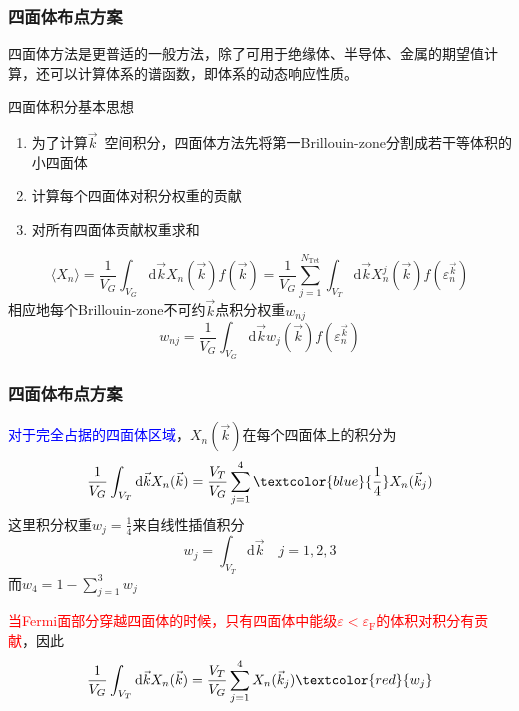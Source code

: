 \frame
{
	\frametitle{四面体布点方案}
	四面体方法是更普适的一般方法，除了可用于绝缘体、半导体、金属的期望值计算，还可以计算体系的谱函数，即体系的动态响应性质。

	四面体积分基本思想
	\begin{enumerate}
		\item 为了计算$\vec k$~空间积分，四面体方法先将第一\textrm{Brillouin-zone}分割成若干等体积的小四面体
		\item 计算每个四面体对积分权重的贡献
		\item 对所有四面体贡献权重求和
	\end{enumerate}
	\begin{displaymath}
		\langle X_n\rangle=\dfrac1{V_G}\int_{V_G}\mathrm{d}\vec kX_n(\vec k)f(\vec k)=\dfrac1{V_G}\sum_{j=1}^{N_{\mathrm{Tet}}}\int_{V_T}\mathrm{d}\vec kX_n^j(\vec k)f(\varepsilon_n^{\vec k})
	\end{displaymath}
	相应地每个\textrm{Brillouin-zone}不可约$\vec k$点积分权重$w_{nj}$
	\begin{displaymath}
		w_{nj}=\dfrac1{V_G}\int_{V_G}\mathrm{d}\vec kw_j(\vec k)f(\varepsilon_n^{\vec k})
	\end{displaymath}
}

\frame
{
	\frametitle{四面体布点方案}
	\textcolor{blue}{对于完全占据的四面体区域}，$X_n(\vec k)$在每个四面体上的积分为
	\begin{displaymath}
		\dfrac1{V_G}\int_{V_T}\mathrm{d}\vec k X_n(\vec k)=\dfrac{V_T}{V_G}\sum_{j=1}^4\textcolor{blue}{\dfrac14}X_n(\vec k_j)
	\end{displaymath}
	这里积分权重$w_j=\frac14$来自线性插值积分
	$$w_j=\int_{V_T}\mathrm{d}\vec k\quad j=1,2,3$$
	而$w_4=1-\sum\limits_{j=1}^3w_j$

	\textcolor{red}{当\textrm{Fermi}面部分穿越四面体的时候，只有四面体中能级$\varepsilon<\varepsilon_{\mathrm{F}}$的体积对积分有贡献}，因此
	\begin{displaymath}
		\dfrac1{V_G}\int_{V_T}\mathrm{d}\vec k X_n(\vec k)=\dfrac{V_T}{V_G}\sum_{j=1}^4X_n(\vec k_j)\textcolor{red}{w_j}
	\end{displaymath}
}

